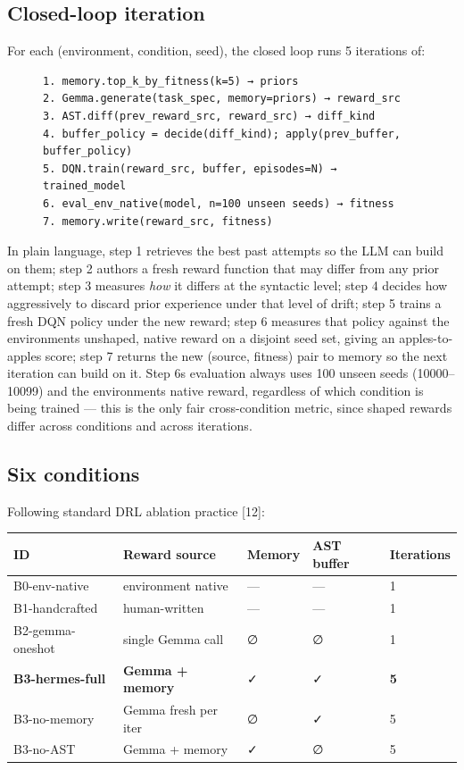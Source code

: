 \documentclass[conference,letterpaper,10pt]{IEEEtran}
\begin{document}
\subsection{Closed-loop iteration}

For each (environment, condition, seed), the closed loop runs 5 iterations of:

\begin{figure}[t]
\centering
\small
\begin{verbatim}
1. memory.top_k_by_fitness(k=5) → priors
2. Gemma.generate(task_spec, memory=priors) → reward_src
3. AST.diff(prev_reward_src, reward_src) → diff_kind
4. buffer_policy = decide(diff_kind); apply(prev_buffer, buffer_policy)
5. DQN.train(reward_src, buffer, episodes=N) → trained_model
6. eval_env_native(model, n=100 unseen seeds) → fitness
7. memory.write(reward_src, fitness)
\end{verbatim}
\end{figure}

In plain language, step 1 retrieves the best past attempts so the LLM can build on them; step 2 authors a fresh reward function that may differ from any prior attempt; step 3 measures \emph{how} it differs at the syntactic level; step 4 decides how aggressively to discard prior experience under that level of drift; step 5 trains a fresh DQN policy under the new reward; step 6 measures that policy against the environment\textquotesingle s unshaped, native reward on a disjoint seed set, giving an apples-to-apples score; step 7 returns the new (source, fitness) pair to memory so the next iteration can build on it. Step 6\textquotesingle s evaluation always uses 100 unseen seeds (10000--10099) and the environment\textquotesingle s native reward, regardless of which condition is being trained --- this is the only fair cross-condition metric, since shaped rewards differ across conditions and across iterations.

\subsection{Six conditions}

Following standard DRL ablation practice {[}12{]}:

\begin{table}[t]
\centering
\small
\begin{tabular}{@{}lllll@{}}
\toprule
ID & Reward source & Memory & AST buffer & Iterations \\
\midrule
B0-env-native & environment native & --- & --- & 1 \\
B1-handcrafted & human-written & --- & --- & 1 \\
B2-gemma-oneshot & single Gemma call & ∅ & ∅ & 1 \\
\textbf{B3-hermes-full} & \textbf{Gemma + memory} & ✓ & ✓ & \textbf{5} \\
B3-no-memory & Gemma fresh per iter & ∅ & ✓ & 5 \\
B3-no-AST & Gemma + memory & ✓ & ∅ & 5 \\
\bottomrule
\end{tabular}
\end{table}
\end{document}
